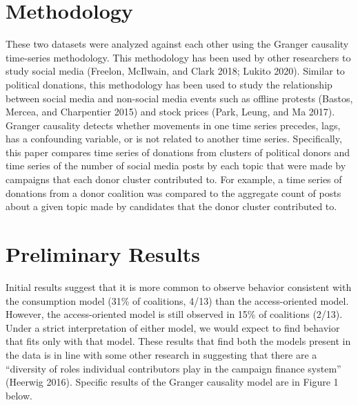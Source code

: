 \documentclass[12pt,]{article}
\begin{document}
\hypertarget{methodology}{%
\section{Methodology}\label{methodology}}

These two datasets were analyzed against each other using the Granger
causality time-series methodology. This methodology has been used by
other researchers to study social media (Freelon, McIlwain, and Clark
2018; Lukito 2020). Similar to political donations, this methodology has
been used to study the relationship between social media and non-social
media events such as offline protests (Bastos, Mercea, and Charpentier
2015) and stock prices (Park, Leung, and Ma 2017). Granger causality
detects whether movements in one time series precedes, lags, has a
confounding variable, or is not related to another time series.
Specifically, this paper compares time series of donations from clusters
of political donors and time series of the number of social media posts
by each topic that were made by campaigns that each donor cluster
contributed to. For example, a time series of donations from a donor
coalition was compared to the aggregate count of posts about a given
topic made by candidates that the donor cluster contributed to.

\hypertarget{preliminary-results}{%
\section{Preliminary Results}\label{preliminary-results}}

Initial results suggest that it is more common to observe behavior
consistent with the consumption model (31\% of coalitions, 4/13) than
the access-oriented model. However, the access-oriented model is still
observed in 15\% of coalitions (2/13). Under a strict interpretation of
either model, we would expect to find behavior that fits only with that
model. These results that find both the models present in the data is in
line with some other research in suggesting that there are a ``diversity
of roles individual contributors play in the campaign finance system''
(Heerwig 2016). Specific results of the Granger causality model are in
Figure 1 below.
\end{document}
